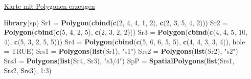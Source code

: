 \documentclass[ignorenonframetext,]{beamer}
\newenvironment{Shaded}{}{}
\newcommand{\KeywordTok}[1]{\textcolor[rgb]{0.00,0.44,0.13}{\textbf{{#1}}}}
\newcommand{\DataTypeTok}[1]{\textcolor[rgb]{0.56,0.13,0.00}{{#1}}}
\newcommand{\DecValTok}[1]{\textcolor[rgb]{0.25,0.63,0.44}{{#1}}}
\newcommand{\StringTok}[1]{\textcolor[rgb]{0.25,0.44,0.63}{{#1}}}
\newcommand{\OtherTok}[1]{\textcolor[rgb]{0.00,0.44,0.13}{{#1}}}
\newcommand{\NormalTok}[1]{{#1}}
\begin{document}
\begin{frame}[fragile]{\href{https://rstudio.github.io/leaflet/map_widget.html}{Karte
mit Polygonen erzeugen}}

\begin{Shaded}
\begin{Highlighting}[]
\KeywordTok{library}\NormalTok{(sp)}
\NormalTok{Sr1 =}\StringTok{ }\KeywordTok{Polygon}\NormalTok{(}\KeywordTok{cbind}\NormalTok{(}\KeywordTok{c}\NormalTok{(}\DecValTok{2}\NormalTok{, }\DecValTok{4}\NormalTok{, }\DecValTok{4}\NormalTok{, }\DecValTok{1}\NormalTok{, }\DecValTok{2}\NormalTok{), }\KeywordTok{c}\NormalTok{(}\DecValTok{2}\NormalTok{, }\DecValTok{3}\NormalTok{, }\DecValTok{5}\NormalTok{, }\DecValTok{4}\NormalTok{, }\DecValTok{2}\NormalTok{)))}
\NormalTok{Sr2 =}\StringTok{ }\KeywordTok{Polygon}\NormalTok{(}\KeywordTok{cbind}\NormalTok{(}\KeywordTok{c}\NormalTok{(}\DecValTok{5}\NormalTok{, }\DecValTok{4}\NormalTok{, }\DecValTok{2}\NormalTok{, }\DecValTok{5}\NormalTok{), }\KeywordTok{c}\NormalTok{(}\DecValTok{2}\NormalTok{, }\DecValTok{3}\NormalTok{, }\DecValTok{2}\NormalTok{, }\DecValTok{2}\NormalTok{)))}
\NormalTok{Sr3 =}\StringTok{ }\KeywordTok{Polygon}\NormalTok{(}\KeywordTok{cbind}\NormalTok{(}\KeywordTok{c}\NormalTok{(}\DecValTok{4}\NormalTok{, }\DecValTok{4}\NormalTok{, }\DecValTok{5}\NormalTok{, }\DecValTok{10}\NormalTok{, }\DecValTok{4}\NormalTok{), }\KeywordTok{c}\NormalTok{(}\DecValTok{5}\NormalTok{, }\DecValTok{3}\NormalTok{, }\DecValTok{2}\NormalTok{, }\DecValTok{5}\NormalTok{, }\DecValTok{5}\NormalTok{)))}
\NormalTok{Sr4 =}\StringTok{ }\KeywordTok{Polygon}\NormalTok{(}\KeywordTok{cbind}\NormalTok{(}\KeywordTok{c}\NormalTok{(}\DecValTok{5}\NormalTok{, }\DecValTok{6}\NormalTok{, }\DecValTok{6}\NormalTok{, }\DecValTok{5}\NormalTok{, }\DecValTok{5}\NormalTok{), }\KeywordTok{c}\NormalTok{(}\DecValTok{4}\NormalTok{, }\DecValTok{4}\NormalTok{, }\DecValTok{3}\NormalTok{, }\DecValTok{3}\NormalTok{, }\DecValTok{4}\NormalTok{)), }\DataTypeTok{hole =} \OtherTok{TRUE}\NormalTok{)}
\NormalTok{Srs1 =}\StringTok{ }\KeywordTok{Polygons}\NormalTok{(}\KeywordTok{list}\NormalTok{(Sr1), }\StringTok{"s1"}\NormalTok{)}
\NormalTok{Srs2 =}\StringTok{ }\KeywordTok{Polygons}\NormalTok{(}\KeywordTok{list}\NormalTok{(Sr2), }\StringTok{"s2"}\NormalTok{)}
\NormalTok{Srs3 =}\StringTok{ }\KeywordTok{Polygons}\NormalTok{(}\KeywordTok{list}\NormalTok{(Sr4, Sr3), }\StringTok{"s3/4"}\NormalTok{)}
\NormalTok{SpP =}\StringTok{ }\KeywordTok{SpatialPolygons}\NormalTok{(}\KeywordTok{list}\NormalTok{(Srs1, Srs2, Srs3), }\DecValTok{1}\NormalTok{:}\DecValTok{3}\NormalTok{)}
\end{Highlighting}
\end{Shaded}


\end{frame}
\end{document}
